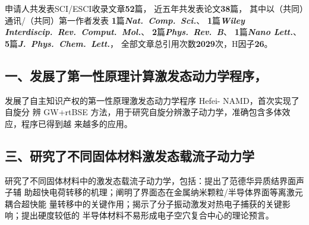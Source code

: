 
申请人共发表SCI/ESCI收录文章{\large\bf{}52}篇，%
{
  近五年共发表论文{\large\bf{}38}篇，
  其中以（共同）通讯/（共同）第一作者发表
  {\bfseries\large{}1}篇{\bfseries\itshape Nat.\ Comp.\ Sci.}、
  {\bfseries\large{}1}篇{\bfseries\itshape Wiley Interdiscip.\ Rev.\ Comput.\ Mol.}、
  {\bfseries\large{}2}篇{\bfseries\itshape Phys.\ Rev.\ B}、
  {\bfseries\large{}1}篇{\bfseries\itshape Nano Lett.}、
  {\bfseries\large{}5}篇{\bfseries\itshape J.\ Phys.\ Chem.\ Lett.}，
  全部文章总引用次数{\large\bf{}2029}次，H因子{\large\bf{}26}。
}

\subsection*{一、发展了第一性原理计算激发态动力学程序\hnamd{}，}

\begin{center}
  \begin{InnovationBox}
    发展了自主知识产权的第一性原理激发态动力学程序 Hefei- NAMD，首次实现了自旋分
    辨 GW+rtBSE 方法，用于研究自旋分辨激子动力学，准确包含多体效应，程序已得到越
    来越多的应用。
  \end{InnovationBox}
\end{center}

\subsection*{三、研究了不同固体材料激发态载流子动力学}
\begin{center}
  \begin{InnovationBox}
    研究了不同固体材料中的激发态载流子动力学，包括：提出了范德华异质结界面声子辅
    助超快电荷转移的机理；阐明了界面态在金属纳米颗粒/半导体界面等离激元耦合超快能
    量转移中的关键作用；揭示了分子振动激发对热电子捕获的关键影响；提出硬度较低的
    半导体材料不易形成电子空穴复合中心的理论预言。
  \end{InnovationBox}
\end{center}

